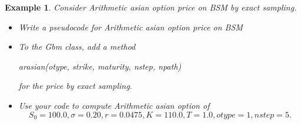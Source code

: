 \documentclass{article}
\newtheorem{example}{Example}
\begin{document}
\begin{example}\label{exm:aao}  Consider  Arithmetic asian option price on BSM by exact sampling.
\begin{itemize}
\item Write a pseudocode for Arithmetic asian option price on BSM
\item To the Gbm class, add a method 
\begin{center} 
{\rm arasian(otype, strike, maturity, nstep, npath)}
\end{center} 
for the price by exact sampling.
\item Use your code to compute Arithmetic asian option of 
$$S_0 = 100.0, \sigma= 0.20, r=0.0475, K = 110.0, T = 1.0, otype = 1, nstep = 5.$$
\end{itemize}
\end{example}
\end{document}
